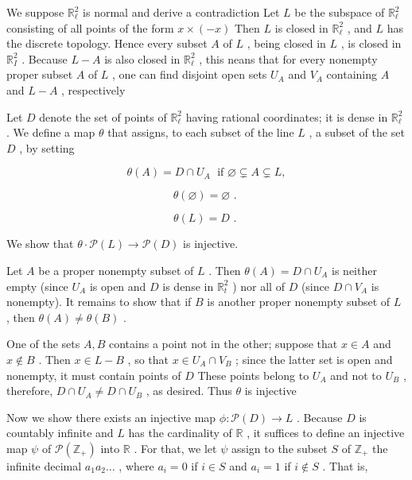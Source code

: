 We suppose \({\mathbb{R}}_{\ell }^{2}\) is normal and derive a contradiction Let \(L\) be the subspace of \({\mathbb{R}}_{\ell }^{2}\) consisting of all points of the form \(x \times  \left( {-x}\right)\) Then \(L\) is closed in \({\mathbb{R}}_{\ell }^{2}\) , and \(L\) has the discrete topology. Hence every subset \(A\) of \(L\) , being closed in \(L\) , is closed in \({\mathbb{R}}_{I}^{2}\) . Because \(L - A\) is also closed in \({\mathbb{R}}_{\ell }^{2}\) , this neans that for every nonempty proper subset \(A\) of \(L\) , one can find disjoint open sets \({U}_{A}\) and \({V}_{A}\) containing \(A\) and \(L - A\) , respectively

Let \(D\) denote the set of points of \({\mathbb{R}}_{\ell }^{2}\) having rational coordinates; it is dense in \({\mathbb{R}}_{\ell }^{2}\) . We define a map \(\theta\) that assigns, to each subset of the line \(L\) , a subset of the set \(D\) , by setting

\[
\theta \left( A\right)  = D \cap  {U}_{A}\;\text{ if }\varnothing  \subsetneq  A \subsetneq  L,
\]

\[
\theta \left( \varnothing \right)  = \varnothing \text{ . }
\]

\[
\theta \left( L\right)  = D\text{ . }
\]

We show that \(\theta  \cdot  \mathcal{P}\left( L\right)  \rightarrow  \mathcal{P}\left( D\right)\) is injective.

Let \(A\) be a proper nonempty subset of \(L\) . Then \(\theta \left( A\right)  = D \cap  {U}_{A}\) is neither empty (since \({U}_{A}\) is open and \(D\) is dense in \({\mathbb{R}}_{t}^{2}\) ) nor all of \(D\) (since \(D \cap  {V}_{A}\) is nonempty). It remains to show that if \(B\) is another proper nonempty subset of \(L\) , then \(\theta \left( A\right)  \neq  \theta \left( B\right)\) .

One of the sets \(A,B\) contains a point not in the other; suppose that \(x \in  A\) and \(x \notin  B\) . Then \(x \in  L - B\) , so that \(x \in  {U}_{A} \cap  {V}_{B}\) ; since the latter set is open and nonempty, it must contain points of \(D\) These points belong to \({U}_{A}\) and not to \({U}_{B}\) , therefore, \(D \cap  {U}_{A} \neq  D \cap  {U}_{B}\) , as desired. Thus \(\theta\) is injective

Now we show there exists an injective map \(\phi  : \mathcal{P}\left( D\right)  \rightarrow  L\) . Because \(D\) is countably infinite and \(L\) has the cardinality of \(\mathbb{R}\) , it suffices to define an injective map \(\psi\) of \(\mathcal{P}\left( {\mathbb{Z}}_{ + }\right)\) into \(\mathbb{R}\) . For that, we let \(\psi\) assign to the subset \(S\) of \({\mathbb{Z}}_{ + }\) the infinite decimal \({a}_{1}{a}_{2}\ldots\) , where \({a}_{i} = 0\) if \(i \in  S\) and \({a}_{i} = 1\) if \(i \notin  S\) . That is,

